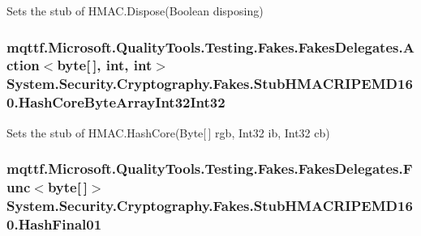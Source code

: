 Sets the stub of H\-M\-A\-C.\-Dispose(\-Boolean disposing)

\hypertarget{class_system_1_1_security_1_1_cryptography_1_1_fakes_1_1_stub_h_m_a_c_r_i_p_e_m_d160_a35058a2441f85ac4a2c535fcdeca7291}{
\subsubsection[{Hash\-Core\-Byte\-Array\-Int32\-Int32}]{\setlength{\rightskip}{0pt plus 5cm}mqttf.\-Microsoft.\-Quality\-Tools.\-Testing.\-Fakes.\-Fakes\-Delegates.\-Action$<$byte\mbox{[}$\,$\mbox{]}, int, int$>$ System.\-Security.\-Cryptography.\-Fakes.\-Stub\-H\-M\-A\-C\-R\-I\-P\-E\-M\-D160.\-Hash\-Core\-Byte\-Array\-Int32\-Int32}}\label{class_system_1_1_security_1_1_cryptography_1_1_fakes_1_1_stub_h_m_a_c_r_i_p_e_m_d160_a35058a2441f85ac4a2c535fcdeca7291}


Sets the stub of H\-M\-A\-C.\-Hash\-Core(\-Byte\mbox{[}$\,$\mbox{]} rgb, Int32 ib, Int32 cb)

\hypertarget{class_system_1_1_security_1_1_cryptography_1_1_fakes_1_1_stub_h_m_a_c_r_i_p_e_m_d160_ae0a1138b86ca377fbef602c2608f8703}{
\subsubsection[{Hash\-Final01}]{\setlength{\rightskip}{0pt plus 5cm}mqttf.\-Microsoft.\-Quality\-Tools.\-Testing.\-Fakes.\-Fakes\-Delegates.\-Func$<$byte\mbox{[}$\,$\mbox{]}$>$ System.\-Security.\-Cryptography.\-Fakes.\-Stub\-H\-M\-A\-C\-R\-I\-P\-E\-M\-D160.\-Hash\-Final01}}\label{class_system_1_1_security_1_1_cryptography_1_1_fakes_1_1_stub_h_m_a_c_r_i_p_e_m_d160_ae0a1138b86ca377fbef602c2608f8703}


